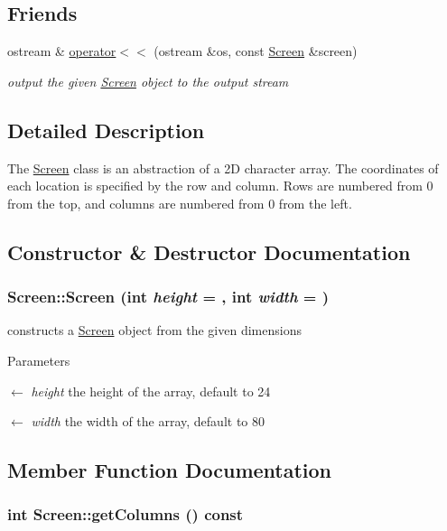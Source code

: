 \subsection*{Friends}
\begin{DoxyCompactItemize}
\item 
ostream \& \hyperlink{classScreen_aa0d87c1b28233bc47310fb992a0a648e}{operator$<$$<$} (ostream \&os, const \hyperlink{classScreen}{Screen} \&screen)
\begin{DoxyCompactList}\small\item\em output the given \hyperlink{classScreen}{Screen} object to the output stream \item\end{DoxyCompactList}\end{DoxyCompactItemize}


\subsection{Detailed Description}
The \hyperlink{classScreen}{Screen} class is an abstraction of a 2D character array. The coordinates of each location is specified by the row and column. Rows are numbered from 0 from the top, and columns are numbered from 0 from the left. 

\subsection{Constructor \& Destructor Documentation}
\hypertarget{classScreen_a44fc6e533a84e710467128a95f20462c}{
\subsubsection[{Screen}]{\setlength{\rightskip}{0pt plus 5cm}Screen::Screen (int {\em height} = {}, \/  int {\em width} = {})}}
\label{classScreen_a44fc6e533a84e710467128a95f20462c}


constructs a \hyperlink{classScreen}{Screen} object from the given dimensions 
\begin{DoxyParams}{Parameters}
\item[\mbox{$\leftarrow$} {\em height}]the height of the array, default to 24 \item[\mbox{$\leftarrow$} {\em width}]the width of the array, default to 80 \end{DoxyParams}


\subsection{Member Function Documentation}
\hypertarget{classScreen_ad910656f46d9b22295fb030b5e2aec3d}{
\subsubsection[{getColumns}]{\setlength{\rightskip}{0pt plus 5cm}int Screen::getColumns () const}}
\label{classScreen_ad910656f46d9b22295fb030b5e2aec3d}


